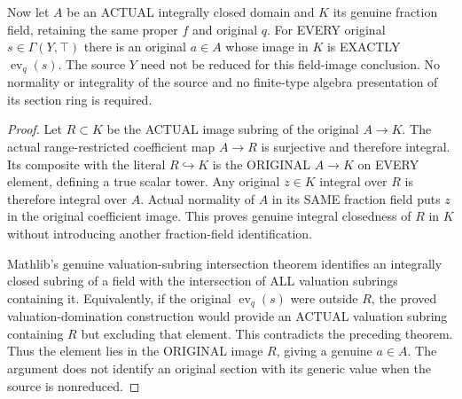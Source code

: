 \begin{theorem}
\label{scheme:actual-normal-proper-global-section-image}
\leanok
{}
Now let $A$ be an ACTUAL integrally closed domain and $K$ its genuine
fraction field, retaining the same proper $f$ and original $q$.
For EVERY original $s\in\Gamma(Y,\top)$ there is an original $a\in A$
whose image in $K$ is EXACTLY $\operatorname{ev}_q(s)$.
The source $Y$ need not be reduced for this field-image conclusion.
No normality or integrality of the source and no finite-type algebra
presentation of its section ring is required.
\end{theorem}
\begin{proof}
Let $R\subset K$ be the ACTUAL image subring of the original $A\to K$.
The actual range-restricted coefficient map $A\to R$ is surjective and
therefore integral. Its composite with the literal $R\hookrightarrow K$
is the ORIGINAL $A\to K$ on EVERY element, defining a true scalar tower.
Any original $z\in K$ integral over $R$ is therefore integral over $A$.
Actual normality of $A$ in its SAME fraction field puts $z$ in the original
coefficient image. This proves genuine integral closedness of $R$ in $K$
without introducing another fraction-field identification.

Mathlib's genuine valuation-subring intersection theorem identifies an
integrally closed subring of a field with the intersection of ALL valuation
subrings containing it. Equivalently, if the original
$\operatorname{ev}_q(s)$ were outside $R$, the proved valuation-domination
construction would provide an ACTUAL valuation subring containing $R$
but excluding that element. This contradicts the preceding theorem.
Thus the element lies in the ORIGINAL image $R$, giving a genuine $a\in A$.
The argument does not identify an original section with its generic value
when the source is nonreduced.
\end{proof}

